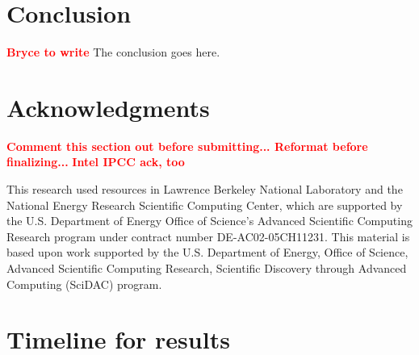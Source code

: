 \documentclass[conference]{IEEEtran}
\newcommand{\fix}[1]{{\bf \textcolor {red}{#1}}}
\begin{document}
\section{Conclusion}
\fix{Bryce to write}
The conclusion goes here.


\section*{Acknowledgments}
\fix{Comment this section out before submitting... Reformat before finalizing...}
\fix{Intel IPCC ack, too}

This research used resources in Lawrence Berkeley National Laboratory and the National Energy Research Scientific Computing Center, which are supported by the U.S. Department of Energy Office of Science's Advanced Scientific Computing Research program under contract number DE-AC02-05CH11231.  
This material is based upon work supported by the U.S. Department of Energy, Office of Science, Advanced Scientific Computing Research, Scientific Discovery through Advanced Computing (SciDAC) program.






\newpage
\section*{Timeline for results}



\end{document}
